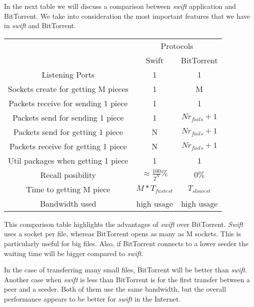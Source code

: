 In the next table we will discuss a comparison between \emph{swift} application and BitTorrent. We take into
consideration the most important features that we have in \emph{swift} and BitTorrent.   

\begin{center}
  \begin{tabular}{|c|c|c|}
	  \toprule
	  \centering{Properties} & \multicolumn{2}{|c|}{Protocols} \\
	  \cmidrule(r){2-3}
	  & Swift & BitTorrent \\
	  \midrule
	  Listening Ports  & 1 & 1 \\
	  \midrule
	  Sockets create for getting M pieces & 1 & M \\
	  \midrule
	  Packets receive for sending 1 piece & 1 & 1 \\
	  \midrule
	  Packets send for sending 1 piece & 1 & $Nr_{fails} + 1$\\
	  \midrule
	  Packets send for getting 1 piece & N & $Nr_{fails} + 1$ \\
	  \midrule
	  Packets receive for getting 1 piece & N & $Nr_{fails} + 1$ \\
	  \midrule
	  Util packages when getting 1 piece & 1 & 1 \\
	  \midrule
	  Recall posibility  & $\approx$$\frac{100}{2^{N}}\%$ & $0\%$ \\
	  \midrule
	  Time to getting M piece & $M * T_{fastest}$ & $T_{slowest}$ \\
	  \midrule
	  Bandwidth used   & high usage & high usage \\
	  \bottomrule
  \end{tabular}
\end{center}

This comparison table highlights the advantages of \emph{swift} over BitTorrent. \emph{Swift} uses a socket per file,
whereas BitTorrent opens as many as M sockets. This is particularly useful for big files. Also, if BitTorrent connects
to a lower seeder the waiting time will be bigger compared to \emph{swift}. 

In the case of transferring many small files, BitTorrent will be better than \emph{swift}. Another case when
\emph{swift} is less than BitTorrent is for the first transfer between a peer and a seeder. Both of them use the same
bandwidth, but the overall performance appears to be better for \emph{swift} in the Internet. 
